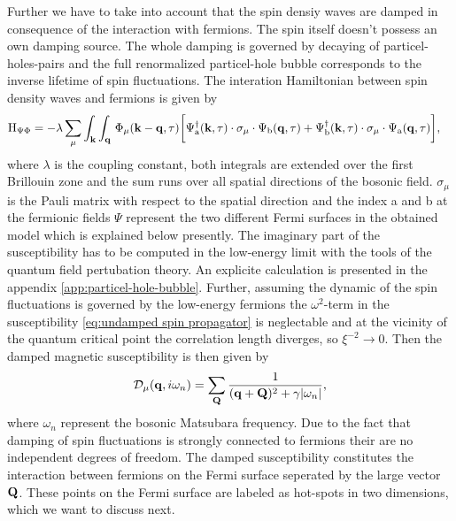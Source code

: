 Further we have to take into account that the spin densiy waves are damped in consequence of the interaction with fermions.
The spin itself doesn't possess an own damping source.
The whole damping is governed by decaying of particel-holes-pairs and the full renormalized particel-hole bubble corresponds to the inverse lifetime of spin fluctuations.
The interation Hamiltonian between spin density waves and fermions is given by
%
\begin{align}
	\mathrm{H}_{\Psi\Phi} &= 
		-\lambda \sum\limits_{\mu} \int_{\vb{k}} \int_{\vb{q}}\,
		\Phi_{\mu}(\vb{k}-\vb{q}, \tau)
		\bigg[
			\Psi_{\mathrm{a}}^{\dag}(\vb{k},\tau) \cdot \sigma_{\mu} \cdot \Psi_{\mathrm{b}}(\vb{q},\tau)
			+
			\Psi_{\mathrm{b}}^{\dag}(\vb{k},\tau) \cdot \sigma_{\mu} \cdot \Psi_{\mathrm{a}}(\vb{q},\tau)
		\bigg],
	\label{eq:Hamiltonian interaction}
\end{align}
%
where $\lambda$ is the coupling constant, both integrals are extended over the first Brillouin zone and the sum runs over all spatial directions of the bosonic field.
$\sigma_{\mu}$ is the Pauli matrix with respect to the spatial direction and the index a and b at the fermionic fields $\Psi$ represent the two different Fermi surfaces in the obtained model which is explained below presently.
The imaginary part of the susceptibility has to be computed in the low-energy limit with the tools of the quantum field pertubation theory.
An explicite calculation is presented in the appendix \ref{app:particel-hole-bubble}.
Further, assuming the dynamic of the spin fluctuations is governed by the low-energy fermions the $\omega^{2}$-term in the susceptibility \eqref{eq:undamped spin propagator} is neglectable \cite{Abanov&Chubukov&Schmalian} and at the vicinity of the quantum critical point the correlation length diverges, so $\xi^{-2} \to 0$.
Then the damped magnetic susceptibility is then given by
%
\begin{align}
	\mathcal{D}_{\mu}(\vb{q}, i\omega_{n}) = \sum\limits_{\vb{Q}} \frac{1}{(\vb{q}+\vb{Q})^{2} + \gamma|\omega_{n}|},
	\label{eq:damped spin propagator}
\end{align}
%
where $\omega_{n}$ represent the bosonic Matsubara frequency.
Due to the fact that damping of spin fluctuations is strongly connected to fermions their are no independent degrees of freedom.
The damped susceptibility constitutes the interaction between fermions on the Fermi surface seperated by the large vector $\vb{Q}$.
These points on the Fermi surface are labeled as hot-spots in two dimensions, which we want to discuss next.
%
